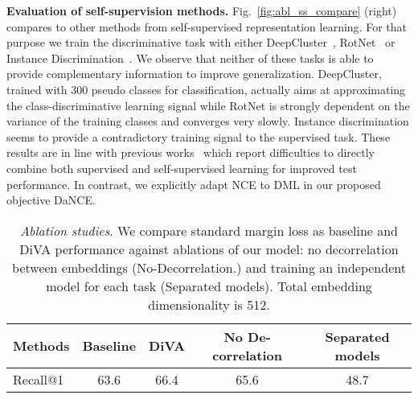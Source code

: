 \documentclass[runningheads]{llncs}
\begin{document}
\textbf{Evaluation of self-supervision methods.} Fig.~\ref{fig:abl_ss_compare} (right) compares  to other methods from self-supervised representation learning. For that purpose we train the discriminative task with either DeepCluster~\cite{deepcluster}, RotNet~\cite{predict_rotations} or Instance Discrimination~\cite{wu2018unsupervised}. We observe that neither of these tasks is able to provide complementary information to improve generalization. DeepCluster, trained with 300 pseudo classes for classification, actually aims at approximating the class-discriminative learning signal while RotNet is strongly dependent on the variance of the training classes and converges very slowly. Instance discrimination seems to provide a contradictory training signal to the supervised task. These results are in line with previous works~\cite{hendrycksSSLAUG} which report difficulties to directly combine both supervised and self-supervised learning for improved test performance. In contrast, we explicitly adapt NCE to DML in our proposed objective DaNCE.
\begin{table*}[t]
    \setlength\tabcolsep{1.5pt}
    \centering
     \begin{tabular}{l|c|c|c|c}
        \toprule
        Methods   & Baseline & DiVA & No De-correlation & Separated models\\
        \hline
        Recall@1  & 63.6     & 66.4 & 65.6              & 48.7\\        
        \bottomrule
    \end{tabular}
    \caption{\textit{Ablation studies}. We compare standard margin loss as baseline and DiVA performance against ablations of our model: no decorrelation between embeddings (No-Decorrelation.) and training an independent model for each task (Separated models). Total embedding dimensionality is 512.}
    \vspace{-1pt}
    \label{tab:ablations}
\end{table*}
\end{document}
